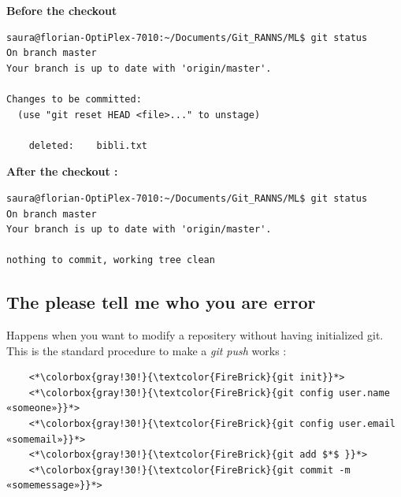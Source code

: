\documentclass[a4paper,12pt]{article}
\numberwithin{equation}{section} %
\begin{document}
\textbf{Before the checkout} 
\begin{lstlisting}
saura@florian-OptiPlex-7010:~/Documents/Git_RANNS/ML$ git status
On branch master
Your branch is up to date with 'origin/master'.

Changes to be committed:
  (use "git reset HEAD <file>..." to unstage)

	deleted:    bibli.txt

\end{lstlisting}

\textbf{After the checkout :}

\begin{lstlisting}
saura@florian-OptiPlex-7010:~/Documents/Git_RANNS/ML$ git status
On branch master
Your branch is up to date with 'origin/master'.

nothing to commit, working tree clean

\end{lstlisting}

\pagebreak

\subsection*{The please tell me who you are error}
Happens when you want to modify a repositery without having initialized git.\\
This is the standard procedure to make a \textit{git push} works :
\begin{lstlisting}
	<*\colorbox{gray!30!}{\textcolor{FireBrick}{git init}}*>
	<*\colorbox{gray!30!}{\textcolor{FireBrick}{git config user.name «someone»}}*>
	<*\colorbox{gray!30!}{\textcolor{FireBrick}{git config user.email «somemail»}}*>
	<*\colorbox{gray!30!}{\textcolor{FireBrick}{git add $*$ }}*>
	<*\colorbox{gray!30!}{\textcolor{FireBrick}{git commit -m «somemessage»}}*>
\end{lstlisting}
\end{document}
